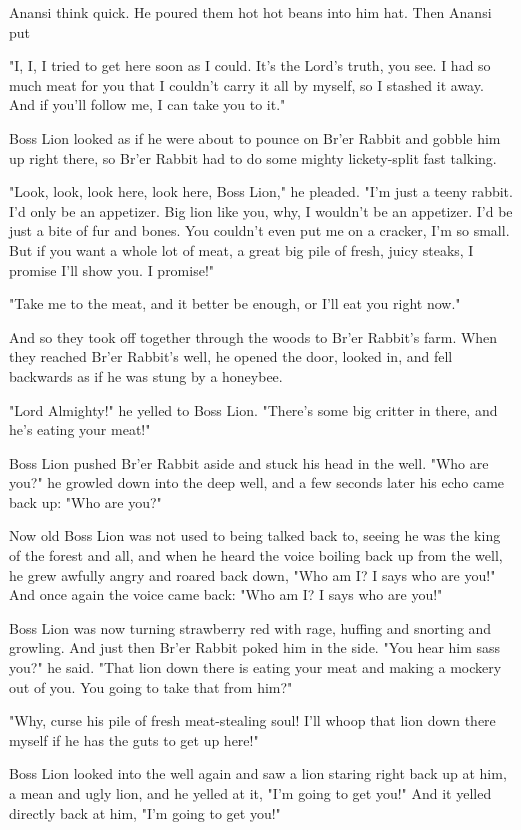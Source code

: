 Anansi think quick. He poured them hot hot beans into him hat. Then Anansi put

"I, I, I tried to get here soon as I could. It's the Lord's truth, you see. I had so much meat for you that I couldn't carry it all by myself, so I stashed it away. And if you'll follow me, I can take you to it."

Boss Lion looked as if he were about to pounce on Br'er Rabbit and gobble him up right there, so Br'er Rabbit had to do some mighty lickety-split fast talking.

"Look, look, look here, look here, Boss Lion," he pleaded. "I'm just a teeny rabbit. I'd only be an appetizer. Big lion like you, why, I wouldn't be an appetizer. I'd be just a bite of fur and bones. You couldn't even put me on a cracker, I'm so small. But if you want a whole lot of meat, a great big pile of fresh, juicy steaks, I promise I'll show you. I promise!"

"Take me to the meat, and it better be enough, or I'll eat you right now."

And so they took off together through the woods to Br'er Rabbit's farm. When they reached Br'er Rabbit's well, he opened the door, looked in, and fell backwards as if he was stung by a honeybee.

"Lord Almighty!" he yelled to Boss Lion. "There's some big critter in there, and he's eating your meat!"

Boss Lion pushed Br'er Rabbit aside and stuck his head in the well. "Who are you?" he growled down into the deep well, and a few seconds later his echo came back up: "Who are you?"

Now old Boss Lion was not used to being talked back to, seeing he was the king of the forest and all, and when he heard the voice boiling back up from the well, he grew awfully angry and roared back down, "Who am I? I says who are you!" And once again the voice came back: "Who am I? I says who are you!"

Boss Lion was now turning strawberry red with rage, huffing and snorting and growling. And just then Br'er Rabbit poked him in the side. "You hear him sass you?" he said. "That lion down there is eating your meat and making a mockery out of you. You going to take that from him?"

"Why, curse his pile of fresh meat-stealing soul! I'll whoop that lion down there myself if he has the guts to get up here!"

Boss Lion looked into the well again and saw a lion staring right back up at him, a mean and ugly lion, and he yelled at it, "I'm going to get you!" And it yelled directly back at him, "I'm going to get you!"

